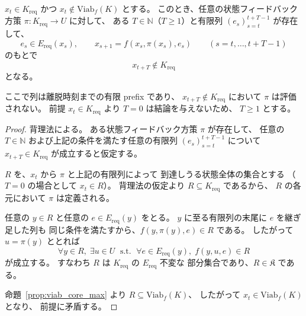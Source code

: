 \begin{lemma}[可行性核外部におけるロバスト可行性の喪失]
\label{lem:finite_exit}
$x_t\in K_{\mathrm{req}}$ かつ
$x_t\notin\mathrm{Viab}_f(K)$ とする。
このとき、任意の状態フィードバック方策
$\pi:K_{\mathrm{req}}\to U$ に対して、
ある $T\in\mathbb{N}$（$T\ge1$）と有限列
$(e_s)_{s=t}^{t+T-1}$ が存在して、
\[
  e_s\in E_{\mathrm{req}}(x_s),
  \qquad
  x_{s+1}=f(x_s,\pi(x_s),e_s)
  \qquad
  (s=t,\ldots,t+T-1)
\]
のもとで
\[
  x_{t+T}\notin K_{\mathrm{req}}
\]
となる。

ここで列は離脱時刻までの有限 prefix であり、
$x_{t+T}\notin K_{\mathrm{req}}$ において $\pi$ は評価されない。
前提 $x_t\in K_{\mathrm{req}}$ より $T=0$ は結論を与えないため、
$T\ge1$ とする。
\end{lemma}

\begin{proof}
背理法による。
ある状態フィードバック方策 $\pi$ が存在して、
任意の $T\in\mathbb{N}$ および上記の条件を満たす任意の有限列
$(e_s)_{s=t}^{t+T-1}$ について
$x_{t+T}\in K_{\mathrm{req}}$ が成立すると仮定する。

$R$ を、$x_t$ から $\pi$ と上記の有限列によって
到達しうる状態全体の集合とする
（$T=0$ の場合として $x_t\in R$）。
背理法の仮定より $R\subseteq K_{\mathrm{req}}$ であるから、
$R$ の各元において $\pi$ は定義される。

任意の $y\in R$ と任意の $e\in E_{\mathrm{req}}(y)$ をとる。
$y$ に至る有限列の末尾に $e$ を継ぎ足した列も
同じ条件を満たすから、$f(y,\pi(y),e)\in R$ である。
したがって $u=\pi(y)$ ととれば
\[
  \forall y\in R,\;
  \exists u\in U
  \;\text{ s.t. }\;
  \forall e\in E_{\mathrm{req}}(y),\;
  f(y,u,e)\in R
\]
が成立する。
すなわち $R$ は $K_{\mathrm{req}}$ の $E_{\mathrm{req}}$ 不変な
部分集合であり、$R\in\mathfrak{K}$ である。

命題~\ref{prop:viab_core_max} より
$R\subseteq\mathrm{Viab}_f(K)$、
したがって $x_t\in\mathrm{Viab}_f(K)$ となり、
前提に矛盾する。
\end{proof}

